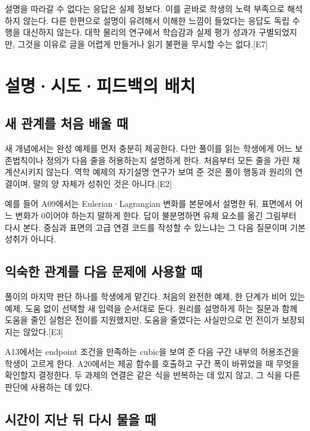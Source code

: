 \documentclass[
  10pt,
  a4paper,
]{article}
\begin{document}
설명을 따라갈 수 없다는 응답은 실제 정보다. 이를 곧바로 학생의 노력
부족으로 해석하지 않는다. 다른 한편으로 설명이 유려해서 이해한 느낌이
들었다는 응답도 독립 수행을 대신하지 않는다. 대학 물리의 연구에서
학습감과 실제 평가 성과가 구별되었지만, 그것을 이유로 글을 어렵게
만들거나 읽기 불편을 무시할 수는 없다.{[}E7{]}

\section{설명·시도·피드백의
배치}\label{uxc124uxba85uxc2dcuxb3c4uxd53cuxb4dcuxbc31uxc758-uxbc30uxce58}

\subsection{새 관계를 처음 배울
때}\label{uxc0c8-uxad00uxacc4uxb97c-uxcc98uxc74c-uxbc30uxc6b8-uxb54c}

새 개념에서는 완성 예제를 먼저 충분히 제공한다. 다만 풀이를 읽는
학생에게 어느 보존법칙이나 정의가 다음 줄을 허용하는지 설명하게 한다.
처음부터 모든 줄을 가린 채 계산시키지 않는다. 역학 예제의 자기설명
연구가 보여 준 것은 풀이 행동과 원리의 연결이며, 말의 양 자체가 성취인
것은 아니다.{[}E2{]}

예를 들어 A09에서는 Eulerian·Lagrangian 변화를 본문에서 설명한 뒤,
표면에서 어느 변화가 0이어야 하는지 말하게 한다. 답이 불분명하면 유체
요소를 옮긴 그림부터 다시 본다. 중심과 표면의 고급 연결 코드를 작성할 수
있느냐는 그 다음 질문이며 기본 성취가 아니다.

\subsection{익숙한 관계를 다음 문제에 사용할
때}\label{uxc775uxc219uxd55c-uxad00uxacc4uxb97c-uxb2e4uxc74c-uxbb38uxc81cuxc5d0-uxc0acuxc6a9uxd560-uxb54c}

풀이의 마지막 판단 하나를 학생에게 맡긴다. 처음의 완전한 예제, 한 단계가
비어 있는 예제, 도움 없이 선택할 새 입력을 순서대로 둔다. 원리를
설명하게 하는 질문과 함께 도움을 줄인 실험은 전이를 지원했지만, 도움을
줄였다는 사실만으로 먼 전이가 보장되지는 않았다.{[}E3{]}

A13에서는 endpoint 조건을 만족하는 cubic을 보여 준 다음 구간 내부의
허용조건을 학생이 고르게 한다. A20에서는 제공 함수를 호출하고 구간 폭이
바뀌었을 때 무엇을 확인할지 결정한다. 두 과제의 연결은 같은 식을
반복하는 데 있지 않고, 그 식을 다른 판단에 사용하는 데 있다.

\subsection{시간이 지난 뒤 다시 물을
때}\label{uxc2dcuxac04uxc774-uxc9c0uxb09c-uxb4a4-uxb2e4uxc2dc-uxbb3cuxc744-uxb54c}
\end{document}
